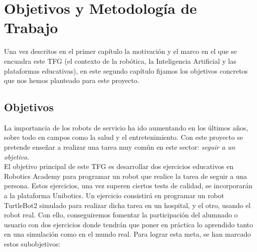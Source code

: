 \chapter{Objetivos y Metodología de Trabajo}
\label{cap:capitulo2}

Una vez descritos en el primer capítulo la motivación y el marco en el que se encuadra este TFG (el contexto de la robótica, la Inteligencia Artificial y las plataformas educativas), en este segundo capítulo fijamos los objetivos concretos que nos hemos planteado para este proyecto.\\

\section{Objetivos}
\label{sec:objetivos}

La importancia de los robots de servicio ha ido aumentando en los últimos años, sobre todo en campos como la salud y el entretenimiento. Con este proyecto se pretende enseñar a realizar una tarea muy común en este sector: \textit{seguir a un objetivo}.\\

El objetivo principal de este TFG es desarrollar dos ejercicios educativos en Robotics Academy para programar un robot que realice la tarea de seguir a una persona. Estos ejercicios, una vez superen ciertos tests de calidad, se incorporarán a la plataforma Unibotics. Un ejercicio consistirá en programar un robot TurtleBot2 simulado para realizar dicha tarea en un hospital, y el otro, usando el robot real. Con ello, conseguiremos fomentar la participación del alumnado o usuario con dos ejercicios donde tendrán que poner en práctica lo aprendido tanto en una simulación como en el mundo real. Para lograr esta meta, se han marcado estos subobjetivos:

